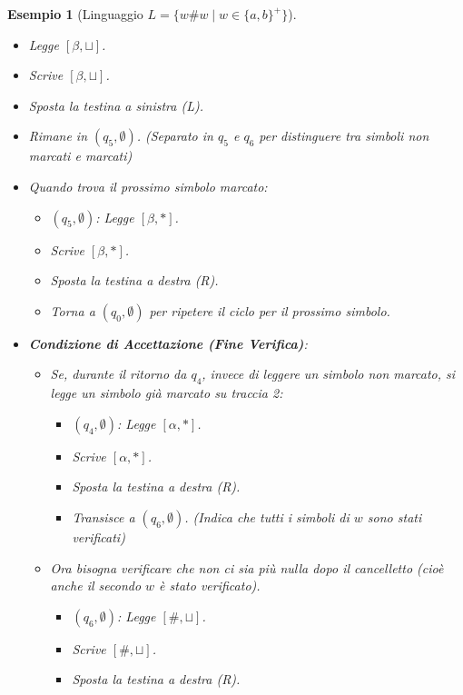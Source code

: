 \documentclass[a4paper, 11pt]{book} %
\newtheorem{example}[theorem]{Esempio}
\theoremstyle{definition}
\begin{document}
\begin{example}[Linguaggio $L = \{w\#w \mid w \in \{a,b\}^+\}$]
\begin{itemize}
\begin{itemize}
            \item Legge $[\beta, \sqcup]$.
            \item Scrive $[\beta, \sqcup]$.
            \item Sposta la testina a sinistra (L).
            \item Rimane in $(q_5, \emptyset)$. (Separato in $q_5$ e $q_6$ per distinguere tra simboli non marcati e marcati)
            \item Quando trova il prossimo simbolo marcato:
                \begin{itemize}
                    \item $(q_5, \emptyset)$: Legge $[\beta, *]$.
                    \item Scrive $[\beta, *]$.
                    \item Sposta la testina a destra (R).
                    \item Torna a $(q_0, \emptyset)$ per ripetere il ciclo per il prossimo simbolo.
                \end{itemize}
            \item \textbf{Condizione di Accettazione (Fine Verifica)}:
                \begin{itemize}
                    \item Se, durante il ritorno da $q_4$, invece di leggere un simbolo non marcato, si legge un simbolo già marcato su traccia 2:
                        \begin{itemize}
                            \item $(q_4, \emptyset)$: Legge $[\alpha, *]$.
                            \item Scrive $[\alpha, *]$.
                            \item Sposta la testina a destra (R).
                            \item Transisce a $(q_6, \emptyset)$. (Indica che tutti i simboli di $w$ sono stati verificati)
                        \end{itemize}
                    \item Ora bisogna verificare che non ci sia più nulla dopo il cancelletto (cioè anche il secondo $w$ è stato verificato).
                        \begin{itemize}
                            \item $(q_6, \emptyset)$: Legge $[\#, \sqcup]$.
                            \item Scrive $[\#, \sqcup]$.
                            \item Sposta la testina a destra (R).

\end{itemize}
\end{itemize}
\end{itemize}
\end{itemize}
\end{example}
\end{document}
